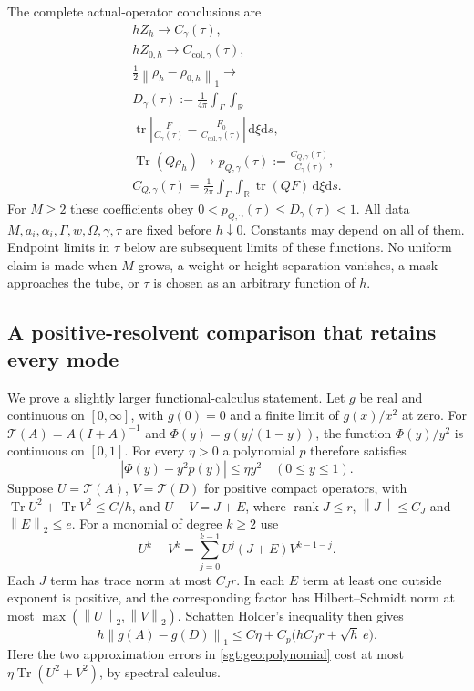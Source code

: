 \documentclass[aps,pra,reprint,superscriptaddress,longbibliography]{revtex4-2}
\newcommand{\Tr}{\operatorname{Tr}}
\newcommand{\dd}{\mathrm d}
\newcommand{\norm}[1]{\left\lVert#1\right\rVert}
\begin{document}
The complete actual-operator conclusions are
\begin{gather}
 hZ_h\longrightarrow C_\gamma(\tau),\\
 hZ_{0,h}\longrightarrow C_{\mathrm{col},\gamma}(\tau),
 \label{sgt:geo:heat-law}\\
 \frac12\norm{\rho_h-\rho_{0,h}}_1
 \longrightarrow
\\
 D_\gamma(\tau):=\frac1{4\pi}\int_\Gamma\int_{\mathbb R}
\\
 \operatorname{tr}\left|
 \frac{F}{C_\gamma(\tau)}-
 \frac{F_0}{C_{\mathrm{col},\gamma}(\tau)}
 \right|\,\dd\xi\dd s,
 \label{sgt:geo:distance}\\
 \Tr(Q\rho_h)\longrightarrow
 p_{Q,\gamma}(\tau):=\frac{C_{Q,\gamma}(\tau)}{C_\gamma(\tau)},\\
 C_{Q,\gamma}(\tau)=\frac1{2\pi}\int_\Gamma\int_{\mathbb R}
                    \operatorname{tr}(QF)\,\dd\xi\dd s.
 \label{sgt:geo:q-law}
\end{gather}
For $M\geq2$ these coefficients obey
$0<p_{Q,\gamma}(\tau)\leq D_\gamma(\tau)<1$.
All data $M,a_i,\alpha_i,\Gamma,w,\Omega,\gamma,\tau$ are fixed before
$h\downarrow0$.  Constants may depend on all of them.  Endpoint limits
in $\tau$ below are subsequent limits of these functions.  No uniform
claim is made when $M$ grows, a weight or height separation vanishes,
a mask approaches the tube, or $\tau$ is chosen as an arbitrary function
of $h$.

\subsection{A positive-resolvent comparison that retains every mode}
\label{sgt:geo:resolvent}

We prove a slightly larger functional-calculus statement.  Let $g$ be
real and continuous on $[0,\infty]$, with $g(0)=0$ and a finite limit
of $g(x)/x^2$ at zero.  For $\mathcal T(A)=A(I+A)^{-1}$ and
$\Phi(y)=g(y/(1-y))$, the function $\Phi(y)/y^2$ is continuous on
$[0,1]$.  For every $\eta>0$ a polynomial $p$ therefore satisfies
\begin{equation}
 |\Phi(y)-y^2p(y)|\leq\eta y^2\quad(0\leq y\leq1).
 \label{sgt:geo:polynomial}
\end{equation}
Suppose $U=\mathcal T(A)$, $V=\mathcal T(D)$ for positive compact operators, with
$\Tr U^2+\Tr V^2\leq C/h$, and
$U-V=J+E$, where $\operatorname{rank}J\leq r$,
$\norm{J}\leq C_J$ and $\norm{E}_2\leq e$.
For a monomial of degree $k\geq2$ use
\[
 U^k-V^k=\sum_{j=0}^{k-1}U^j(J+E)V^{k-1-j}.
\]
Each $J$ term has trace norm at most $C_Jr$.  In each $E$ term at
least one outside exponent is positive, and the corresponding factor
has Hilbert--Schmidt norm at most
$\max(\norm{U}_2,\norm{V}_2)$.  Schatten Holder's inequality then gives
\begin{equation}
 h\norm{g(A)-g(D)}_1
 \leq C\eta+C_p\bigl(hC_Jr+\sqrt h\,e\bigr).
 \label{sgt:geo:comparison}
\end{equation}
Here the two approximation errors in \eqref{sgt:geo:polynomial} cost
at most $\eta\Tr(U^2+V^2)$, by spectral calculus.
\end{document}
